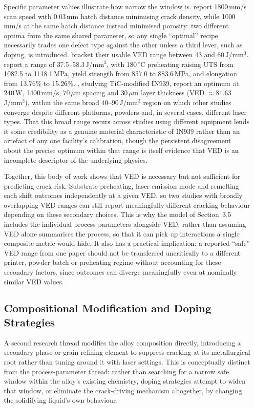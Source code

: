 \documentclass[a4paper]{article}
\begin{document}
Specific parameter values illustrate how narrow the window is. \citet{marchese2020} report 1800\,mm/s scan speed with 0.03\,mm hatch distance minimising crack density, while 1000\,mm/s at the same hatch distance instead minimised porosity: two different optima from the same shared parameter, so any single ``optimal'' recipe necessarily trades one defect type against the other unless a third lever, such as doping, is introduced. \citet{rodriguezbarber2023} bracket their usable VED range between 43 and 60\,J/mm$^3$. \citet{li2024} report a range of 37.5--58.3\,J/mm$^3$, with 180\,$^\circ$C preheating raising UTS from 1082.5 to 1118.1\,MPa, yield strength from 857.0 to 883.6\,MPa, and elongation from 13.76\% to 15.26\%. \citet{chen2026}, studying TiC-modified IN939, report an optimum at 240\,W, 1400\,mm/s, 70\,$\mu$m spacing and 30\,$\mu$m layer thickness (VED $\approx 81.63$\,J/mm$^3$), within the same broad 40--90\,J/mm$^3$ region on which other studies converge despite different platforms, powders and, in several cases, different laser types. That this broad range recurs across studies using different equipment lends it some credibility as a genuine material characteristic of IN939 rather than an artefact of any one facility's calibration, though the persistent disagreement about the precise optimum within that range is itself evidence that VED is an incomplete descriptor of the underlying physics.

Together, this body of work shows that VED is necessary but not sufficient for predicting crack risk. Substrate preheating, laser emission mode and remelting each shift outcomes independently at a given VED, so two studies with broadly overlapping VED ranges can still report meaningfully different cracking behaviour depending on these secondary choices. This is why the model of Section~3.5 includes the individual process parameters alongside VED, rather than assuming VED alone summarises the process, so that it can pick up interactions a single composite metric would hide. It also has a practical implication: a reported ``safe'' VED range from one paper should not be transferred uncritically to a different printer, powder batch or preheating regime without accounting for these secondary factors, since outcomes can diverge meaningfully even at nominally similar VED values.

\subsection{Compositional Modification and Doping Strategies}
A second research thread modifies the alloy composition directly, introducing a secondary phase or grain-refining element to suppress cracking at its metallurgical root rather than tuning around it with laser settings. This is conceptually distinct from the process-parameter thread: rather than searching for a narrow safe window within the alloy's existing chemistry, doping strategies attempt to widen that window, or eliminate the crack-driving mechanism altogether, by changing the solidifying liquid's own behaviour.
\end{document}

